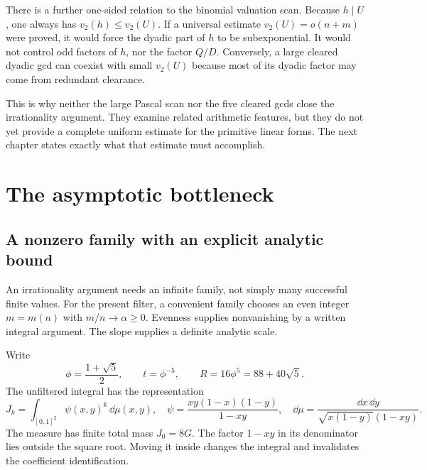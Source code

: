 There is a further one-sided relation to the binomial valuation scan. Because $h\mid U$, one always has $v_2(h)\leq v_2(U)$. If a universal estimate $v_2(U)=o(n+m)$ were proved, it would force the dyadic part of $h$ to be subexponential. It would not control odd factors of $h$, nor the factor $Q/D$. Conversely, a large cleared dyadic gcd can coexist with small $v_2(U)$ because most of its dyadic factor may come from redundant clearance.

This is why neither the large Pascal scan nor the five cleared gcds close the irrationality argument. They examine related arithmetic features, but they do not yet provide a complete uniform estimate for the primitive linear forms. The next chapter states exactly what that estimate must accomplish.

\chapter{The asymptotic bottleneck}
\label{chap:asymptotic-bottleneck}

\section{A nonzero family with an explicit analytic bound}

An irrationality argument needs an infinite family, not simply many successful finite values. For the present filter, a convenient family chooses an even integer $m=m(n)$ with $m/n\to\alpha\geq0$. Evenness supplies nonvanishing by a written integral argument. The slope supplies a definite analytic scale.

Write
\begin{equation}
 \phi=\frac{1+\sqrt5}{2},\qquad t=\phi^{-5},
 \qquad R=16\phi^5=88+40\sqrt5.
 \label{eq:asymptotic-constants}
\end{equation}
The unfiltered integral has the representation
\begin{equation}
 J_k=\int_{[0,1]^2}\psi(x,y)^k\,\dd\mu(x,y),
 \quad
 \psi=\frac{xy(1-x)(1-y)}{1-xy},
 \quad
 \dd\mu=\frac{\dd x\,\dd y}{\sqrt{x(1-y)}(1-xy)}.
 \label{eq:bottleneck-measure}
\end{equation}
The measure has finite total mass $J_0=8G$. The factor $1-xy$ in its denominator lies outside the square root. Moving it inside changes the integral and invalidates the coefficient identification.

